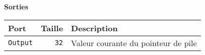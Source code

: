 \documentclass{article}
\begin{document}
    \vspace{1em}
    \textbf{Sorties}\\

    \begin{tabular}{|l|r|l|}
        \hline
        \textbf{Port}     & \textbf{Taille} & \textbf{Description}                \\
        \hline

        \hline
        \texttt{Output} & \texttt{32}     & Valeur courante du pointeur de pile \\

        \hline
    \end{tabular}
\end{document}
